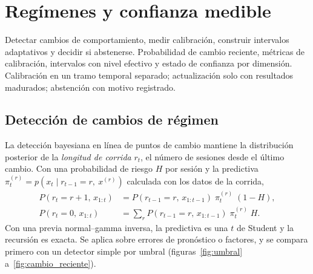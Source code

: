 \clearpage
\section{Regímenes y confianza medible}\label{sec:confianza}

{Detectar cambios de comportamiento, medir calibración, construir intervalos adaptativos y decidir si
abstenerse.}
{Probabilidad de cambio reciente, métricas de calibración, intervalos con nivel efectivo y estado de
confianza por dimensión.}
{Calibración en un tramo temporal separado; actualización solo con resultados madurados; abstención con
motivo registrado.}

\subsection{Detección de cambios de régimen}\label{sec:bocpd}

La detección bayesiana en línea de puntos de cambio \citep{adams2007} mantiene la distribución posterior
de la \emph{longitud de corrida} $r_t$, el número de sesiones desde el último cambio. Con una probabilidad
de riesgo $H$ por sesión y la predictiva $\pi_t^{(r)}=p(x_t\mid r_{t-1}=r,\ x^{(r)})$ calculada con los
datos de la corrida,
\begin{align}
P(r_t=r+1,\,x_{1:t}) &= P(r_{t-1}=r,\,x_{1:t-1})\;\pi_t^{(r)}\;(1-H),\label{eq:bocpd1}\\
P(r_t=0,\,x_{1:t}) &= \textstyle\sum_{r}P(r_{t-1}=r,\,x_{1:t-1})\;\pi_t^{(r)}\;H .\label{eq:bocpd2}
\end{align}
Con una previa normal--gamma inversa, la predictiva es una $t$ de Student y la recursión es exacta. Se
aplica sobre errores de pronóstico o factores, y se compara primero con un detector simple por umbral
(figuras~\ref{fig:umbral} a~\ref{fig:cambio_reciente}).



